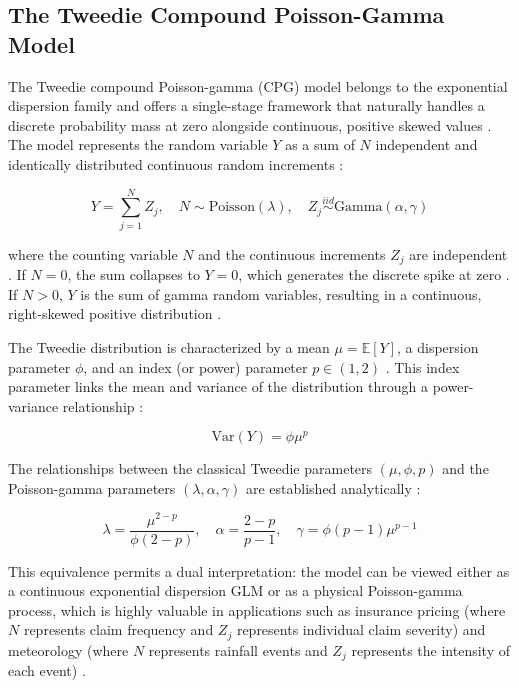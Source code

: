 \documentclass[11pt, a4paper]{article}
\begin{document}
\subsection{The Tweedie Compound Poisson-Gamma Model}
The Tweedie compound Poisson-gamma (CPG) model belongs to the exponential dispersion family and offers a single-stage framework that naturally handles a discrete probability mass at zero alongside continuous, positive skewed values \cite{ref9, ref11, ref25}. The model represents the random variable $Y$ as a sum of $N$ independent and identically distributed continuous random increments \cite{ref9, ref10, ref26}:

\begin{equation}
Y = \sum_{j=1}^{N} Z_j, \quad N \sim \text{Poisson}(\lambda), \quad Z_j \overset{iid}{\sim} \text{Gamma}(\alpha, \gamma)
\end{equation}

where the counting variable $N$ and the continuous increments $Z_j$ are independent \cite{ref26}. If $N = 0$, the sum collapses to $Y = 0$, which generates the discrete spike at zero \cite{ref9, ref26}. If $N > 0$, $Y$ is the sum of gamma random variables, resulting in a continuous, right-skewed positive distribution \cite{ref9, ref26}.

The Tweedie distribution is characterized by a mean $\mu = \mathbb{E}[Y]$, a dispersion parameter $\phi$, and an index (or power) parameter $p \in (1, 2)$ \cite{ref9, ref11, ref26}. This index parameter links the mean and variance of the distribution through a power-variance relationship \cite{ref9, ref11, ref26}:

\begin{equation}
\text{Var}(Y) = \phi \mu^p
\end{equation}

The relationships between the classical Tweedie parameters $(\mu, \phi, p)$ and the Poisson-gamma parameters $(\lambda, \alpha, \gamma)$ are established analytically \cite{ref26}:

\begin{equation}
\lambda = \frac{\mu^{2-p}}{\phi(2-p)}, \quad \alpha = \frac{2-p}{p-1}, \quad \gamma = \phi(p-1)\mu^{p-1}
\end{equation}

This equivalence permits a dual interpretation: the model can be viewed either as a continuous exponential dispersion GLM or as a physical Poisson-gamma process, which is highly valuable in applications such as insurance pricing (where $N$ represents claim frequency and $Z_j$ represents individual claim severity) \cite{ref9, ref25, ref27} and meteorology (where $N$ represents rainfall events and $Z_j$ represents the intensity of each event) \cite{ref9}.
\end{document}
